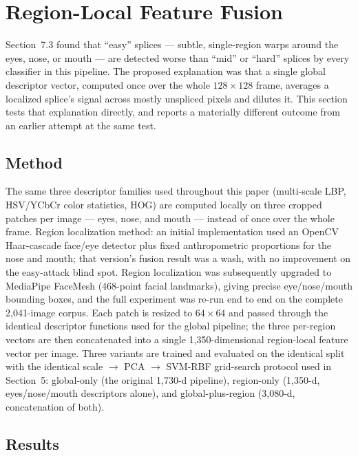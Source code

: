 \documentclass[11pt]{article}
\begin{document}
\section{Region-Local Feature Fusion}
\label{sec:region}

Section~7.3 found that ``easy'' splices --- subtle, single-region warps around the eyes, nose, or mouth --- are detected worse than ``mid'' or ``hard'' splices by every classifier in this pipeline. The proposed explanation was that a single global descriptor vector, computed once over the whole $128\times128$ frame, averages a localized splice's signal across mostly unspliced pixels and dilutes it. This section tests that explanation directly, and reports a materially different outcome from an earlier attempt at the same test.

\subsection{Method}

The same three descriptor families used throughout this paper (multi-scale LBP, HSV/YCbCr color statistics, HOG) are computed locally on three cropped patches per image --- eyes, nose, and mouth --- instead of once over the whole frame. Region localization method: an initial implementation used an OpenCV Haar-cascade face/eye detector plus fixed anthropometric proportions for the nose and mouth; that version's fusion result was a wash, with no improvement on the easy-attack blind spot. Region localization was subsequently upgraded to MediaPipe FaceMesh (468-point facial landmarks), giving precise eye/nose/mouth bounding boxes, and the full experiment was re-run end to end on the complete 2,041-image corpus. Each patch is resized to $64\times64$ and passed through the identical descriptor functions used for the global pipeline; the three per-region vectors are then concatenated into a single 1,350-dimensional region-local feature vector per image. Three variants are trained and evaluated on the identical split with the identical scale $\to$ PCA $\to$ SVM-RBF grid-search protocol used in Section~5: global-only (the original 1,730-d pipeline), region-only (1,350-d, eyes/nose/mouth descriptors alone), and global-plus-region (3,080-d, concatenation of both).

\subsection{Results}
\end{document}

